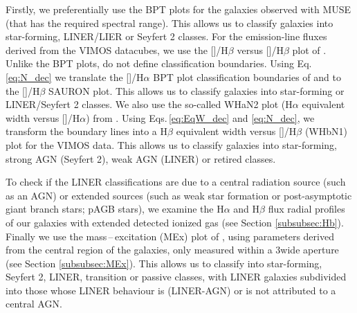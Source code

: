 \documentclass[a4paper,fleqn,usenatbib]{mnras}
\begin{document}
		Firstly, we preferentially use the BPT plots for the galaxies observed with MUSE (that has the required spectral range). This allows us to classify galaxies into star-forming, LINER/LIER or Seyfert 2 classes. For the emission-line fluxes derived from the VIMOS datacubes, we use the []/H$\beta$ versus []/H$\beta$ plot of \citet[hereafter the SAURON plot]{Sarzi2010}. Unlike the BPT plots, \citet{Sarzi2010} do not define classification boundaries. Using Eq.\,\ref{eq:N_dec} we translate the []/H$\alpha$ BPT plot classification boundaries of \citet{Kewley2001} and \citet{Kauffmann2003a} to the []/H$\beta$ SAURON plot. This allows us to classify galaxies into star-forming or LINER/Seyfert 2 classes. We also use the so-called WHaN2 plot (H$\alpha$ equivalent width versus []/H$\alpha$) from \citet{CidFernandes2011}. Using Eqs.\,\ref{eq:EqW_dec} and \ref{eq:N_dec}, we transform the boundary lines into a H$\beta$ equivalent width versus []/H$\beta$ (WHbN1) plot for the VIMOS data. This allows us to classify galaxies into star-forming, strong AGN (Seyfert 2), weak AGN (LINER) or retired classes. 

		To check if the LINER classifications are due to a central radiation source (such as an AGN) or extended sources (such as weak star formation or post-asymptotic giant branch stars; pAGB stars), we examine the H$\alpha$ and H$\beta$ flux radial profiles of our galaxies with extended detected ionized gas (see Section \ref{subsubsec:Hb}). Finally we use the mass\,--\,excitation (MEx) plot of \cite{Nyland2016}, using parameters derived from the central region of the galaxies, only measured within a 3\arcsec wide aperture (see Section \ref{subsubsec:MEx}). This allows us to classify into star-forming, Seyfert 2, LINER, transition or passive classes, with LINER galaxies subdivided into those whose LINER behaviour is (LINER-AGN) or is not attributed to a central AGN. 



\end{document}
